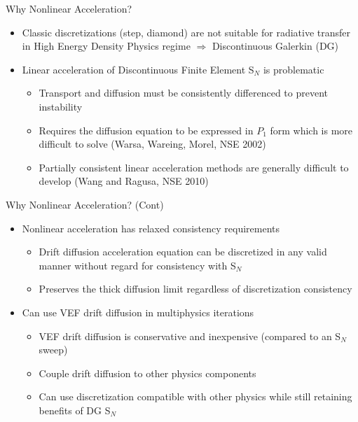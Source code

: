 \documentclass[10pt]{beamer}
\newcommand{\SN}{S$_N$\xspace}
\begin{document}
\begin{frame}{Why Nonlinear Acceleration?}

	\begin{itemize}

		\item Classic discretizations (step, diamond) are not suitable for radiative transfer in High Energy Density Physics regime $\Rightarrow$ Discontinuous Galerkin (DG) 

		\item Linear acceleration of Discontinuous Finite Element \SN is problematic 
		\begin{itemize}
			\item Transport and diffusion must be consistently differenced to prevent instability 

			\item Requires the diffusion equation to be expressed in $P_1$ form which is more difficult to solve (Warsa, Wareing, Morel, NSE 2002) 

			\item Partially consistent linear acceleration methods are generally difficult to develop (Wang and Ragusa, NSE 2010)

		\end{itemize}

	\end{itemize}

\end{frame}

\begin{frame}{Why Nonlinear Acceleration? (Cont)}

	\begin{itemize}

		\item Nonlinear acceleration has relaxed consistency requirements 
		\begin{itemize}
			\item Drift diffusion acceleration equation can be discretized in any valid manner without regard for consistency with \SN  

			\item Preserves the thick diffusion limit regardless of discretization consistency 
		\end{itemize}

		\item Can use VEF drift diffusion in multiphysics iterations 
		\begin{itemize}

			\item VEF drift diffusion is conservative and inexpensive (compared to an \SN sweep) 

			\item Couple drift diffusion to other physics components 

			\item Can use discretization compatible with other physics while still retaining benefits of DG \SN 

		\end{itemize}

	\end{itemize}

\end{frame}
\end{document}
